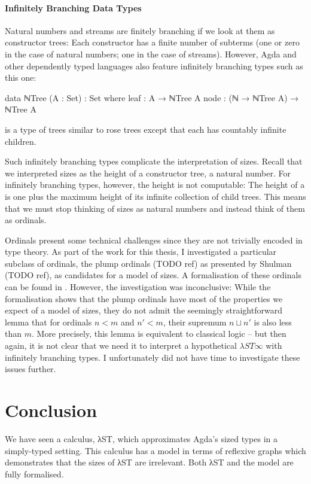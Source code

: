 \paragraph{Infinitely Branching Data Types}

Natural numbers and streams are finitely branching if we look at them as
constructor trees: Each constructor has a finite number of subterms (one or zero
in the case of natural numbers; one in the case of streams). However, Agda and
other dependently typed languages also feature infinitely branching types such
as this one:
\begin{code}
  data ℕTree (A : Set) : Set where
    leaf : A → ℕTree A
    node : (ℕ → ℕTree A) → ℕTree A
\end{code}
 is a type of trees similar to rose trees except that each
 has countably infinite children.

Such infinitely branching types complicate the interpretation of sizes. Recall
that we interpreted sizes as the height of a constructor tree, a natural number.
For infinitely branching types, however, the height is not computable: The
height of a  is one plus the maximum height of its infinite
collection of child trees. This means that we must stop thinking of sizes as
natural numbers and instead think of them as ordinals.

Ordinals present some technical challenges since they are not trivially encoded
in type theory. As part of the work for this thesis, I investigated a particular
subclass of ordinals, the plump ordinals (TODO ref) as presented by Shulman
(TODO ref), as candidates for a model of sizes. A formalisation of these
ordinals can be found in . However, the
investigation was inconclusive: While the formalisation shows that the plump
ordinals have most of the properties we expect of a model of sizes, they do not
admit the seemingly straightforward lemma that for ordinals $n < m$ and $n′ <
m$, their supremum $n ⊔ n′$ is also less than $m$. More precisely, this lemma is
equivalent to classical logic -- but then again, it is not clear that we need it
to interpret a hypothetical $λST∞$ with infinitely branching types. I
unfortunately did not have time to investigate these issues further.


\section{Conclusion}
\label{sec:conclusion:conclusion}

We have seen a calculus, λST, which approximates Agda's sized types in a
simply-typed setting. This calculus has a model in terms of reflexive graphs
which demonstrates that the sizes of λST are irrelevant. Both λST and the model
are fully formalised.
